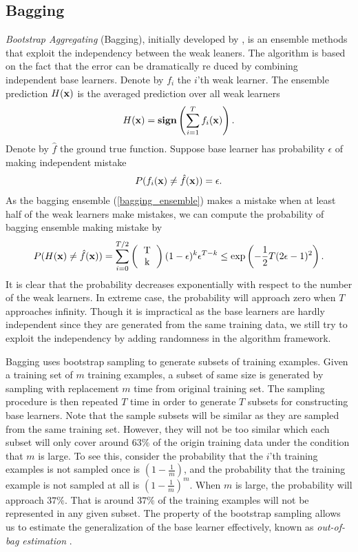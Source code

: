 \subsection{Bagging}
\textit{Bootstrap Aggregating} (Bagging), initially developed by \citet{Breiman96bagging}, is an ensemble methods that exploit the independency between the weak leaners.
The algorithm is based on the fact that the error can be dramatically re duced by combining independent base learners.
Denote by $f_i$ the $i$'th weak learner.
The ensemble prediction $H(\mathbf {x})$ is the averaged prediction over all weak learners
\begin{align}
	H(\mathbf {x}) = \textbf{sign}\left(\sum_{i=1}^{T}f_i(\mathbf {x})\right). \label{bagging_ensemble}
\end{align}
Denote by $\hat{f}$ the ground true function.
Suppose base learner has probability $\epsilon$ of making independent mistake
\begin{align*}
	P(f_i(\mathbf {x}) \ne \hat{f}(\mathbf {x})) = \epsilon.
\end{align*}
As the bagging ensemble (\ref{bagging_ensemble}) makes a mistake when at least half of the weak learners make mistakes, we can compute the probability of bagging ensemble making mistake by
\begin{align*}
	P(H(\vx)\neq\hat{f}(\vx)) = \sum_{i=0}^{T/2}\left(\begin{tabular}{cc}T\\k\end{tabular}\right)(1-\epsilon)^k\epsilon^{T-k} \le\exp\left(-\frac{1}{2}T(2\epsilon-1)^2\right).
\end{align*}
It is clear that the probability decreases exponentially with respect to the number of the weak learners.
In extreme case, the probability will approach zero when $T$ approaches infinity.
Though it is impractical as the base learners are hardly independent since they are generated from the same training data, we still try to exploit the independency by adding randomness in the algorithm framework.

Bagging uses bootstrap sampling \citep{Efron1994introduction} to generate subsets of training examples.
Given a training set of $m$ training examples, a subset of same size is generated by sampling with replacement $m$ time from original training set.
The sampling procedure is then repeated $T$ time in order to generate $T$ subsets for constructing base learners.
Note that the sample subsets will be similar as they are sampled from the same training set.
However, they will not be too similar which each subset will only cover around $63\%$ of the origin training data under the condition that $m$ is large.
To see this, consider the probability that the $i$'th training examples is not sampled once is $(1-\frac{1}{m})$, and the probability that the training example is not sampled at all is $(1-\frac{1}{m})^m$.
When $m$ is large, the probability will approach $37\%$. 
That is around $37\%$ of the training examples will not be represented in any given subset.
The property of the bootstrap sampling allows us to estimate the generalization of the base learner effectively, known as \textit{out-of-bag estimation} \citep{Breiman96out,Tibshirani1996bias,Wolpert99an}.



